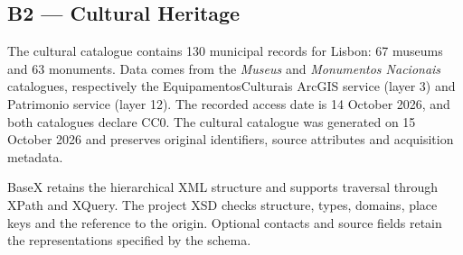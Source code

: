 \subsection{B2 --- Cultural Heritage}
The cultural catalogue contains 130 municipal records for Lisbon: 67 museums and 63 monuments. Data comes from the \emph{Museus} and \emph{Monumentos Nacionais} catalogues, respectively the EquipamentosCulturais ArcGIS service (layer 3) and Patrimonio service (layer 12)\cite{dados_abertos_cml,cml_monumentos}. The recorded access date is 14 October 2026, and both catalogues declare CC0. The cultural catalogue was generated on 15 October 2026 and preserves original identifiers, source attributes and acquisition metadata.

BaseX retains the hierarchical XML structure and supports traversal through XPath and XQuery. The project XSD checks structure, types, domains, place keys and the reference to the origin. Optional contacts and source fields retain the representations specified by the schema.
